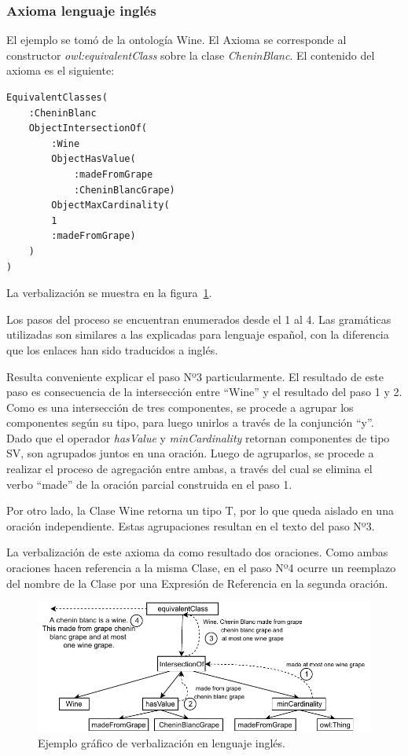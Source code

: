 \subsubsection{Axioma lenguaje inglés}
El ejemplo se tomó de la ontología Wine. El Axioma se corresponde al constructor \emph{owl:equivalentClass} sobre la clase \emph{CheninBlanc}. El contenido del axioma es el siguiente: 

\begin{verbatim}
EquivalentClasses(
    :CheninBlanc
    ObjectIntersectionOf(
        :Wine
        ObjectHasValue(
            :madeFromGrape
            :CheninBlancGrape)
        ObjectMaxCardinality(
        1
        :madeFromGrape)
    )
)
\end{verbatim}
La verbalización se muestra en la figura~\ref{fig:ejemplo_verb_ingles}.

Los pasos del proceso se encuentran enumerados desde el 1 al 4. Las gramáticas utilizadas son similares a las explicadas para lenguaje español, con la diferencia que los enlaces han sido traducidos a inglés.

Resulta conveniente explicar el paso Nº3 particularmente. El resultado de este paso es consecuencia de la intersección entre ``Wine'' y el resultado del paso 1 y 2. 
Como es una intersección de tres componentes, se procede a agrupar los componentes según su tipo, para luego unirlos a través de la conjunción ``y''. Dado que el operador \emph{hasValue} y \emph{minCardinality} retornan componentes de tipo SV, son agrupados juntos en una oración. Luego de agruparlos, se procede a realizar el proceso de agregación entre ambas, a través del cual se elimina el verbo ``made'' de la oración parcial construida en el paso 1. 

Por otro lado, la Clase Wine retorna un tipo T, por lo que queda aislado en una oración independiente. Estas agrupaciones resultan en el texto del paso Nº3.

La verbalización de este axioma da como resultado dos oraciones. Como ambas oraciones hacen referencia a la misma Clase, en el paso Nº4 ocurre un reemplazo del nombre de la Clase por una Expresión de Referencia en la segunda oración. 

\begin{figure}
    \centering
    \includegraphics[width=\textwidth]{img/generacion_documento/verbalizacion_equivalentClass_english.pdf}
    \caption{Ejemplo gráfico de verbalización en lenguaje inglés.}
    \label{fig:ejemplo_verb_ingles}
\end{figure}

